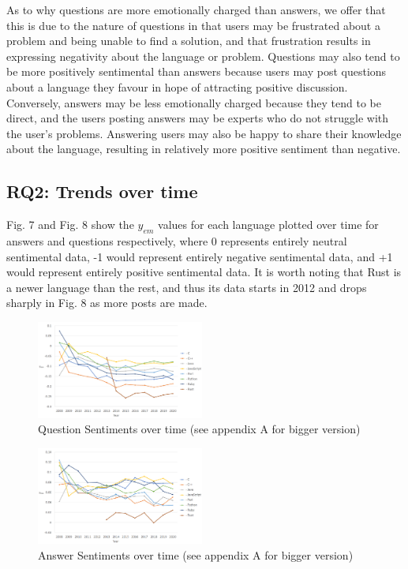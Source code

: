 \documentclass[conference]{IEEEtran}
\begin{document}
As to why questions are more emotionally charged than answers, we offer that this is due to the nature of questions in that users may be frustrated about a problem and being unable to find a solution, and that frustration results in expressing negativity about the language or problem. Questions may also tend to be more positively sentimental than answers because users may post questions about a language they favour in hope of attracting positive discussion. Conversely, answers may be less emotionally charged because they tend to be direct, and the users posting answers may be experts who do not struggle with the user’s problems. Answering users may also be happy to share their knowledge about the language, resulting in relatively more positive sentiment than negative.\\

\subsection{RQ2: Trends over time}
Fig. 7 and Fig. 8 show the $y_{em}$ values for each language plotted over time for answers and questions respectively, where 0 represents entirely neutral sentimental data, -1 would represent entirely negative sentimental data, and +1 would represent entirely positive sentimental data. It is worth noting that Rust is a newer language than the rest, and thus its data starts in 2012 and drops sharply in Fig. 8 as more posts are made. \\

\begin{figure}[htbp]
\centerline{\includegraphics[width=0.49\textwidth]{figures/time_questions_em.png}}
\caption{Question Sentiments over time (see appendix A for bigger version)}
\label{fig}
\end{figure}

\begin{figure}[htbp]
\centerline{\includegraphics[width=0.49\textwidth]{figures/time_answers_em.png}}
\caption{Answer Sentiments over time (see appendix A for bigger version)}
\label{fig}
\end{figure}
\end{document}

